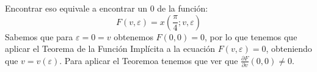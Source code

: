 \documentclass[12pt]{article}
\begin{document}
\begin{ejercicio}
\begin{enumerate}
                Encontrar eso equivale a encontrar un $0$ de la función:
                \begin{equation*}
                    F(v,\varepsilon) = x\left(\frac{\pi}{4};v,\varepsilon\right)
                \end{equation*}
                Sabemos que para $\varepsilon=0 = v$ obtenemos $F(0,0) = 0$, por lo que tenemos que aplicar el Teorema de la Función Implícita a la ecuación $F(v,\varepsilon) = 0$, obteniendo que $v=v(\varepsilon)$. Para aplicar el Teoremoa tenemos que ver que $\frac{\partial F}{\partial v}(0,0)\neq 0$.
        \end{enumerate}
    \end{ejercicio}
\end{document}

